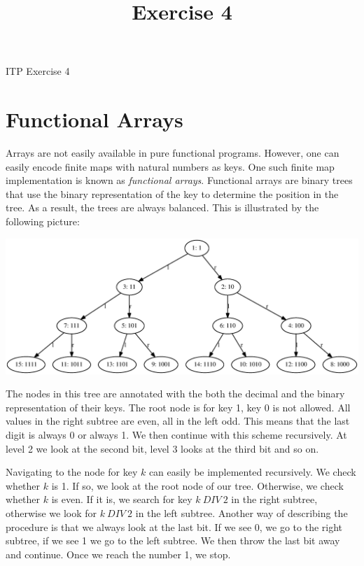 \documentclass[a4paper,10pt,oneside]{scrartcl}
\title{Exercise 4}
\begin{document}
\begin{center}
ITP Exercise 4
\end{center}
\bigskip


\section{Functional Arrays}

Arrays are not easily available in pure functional programs. However,
one can easily encode finite maps with natural numbers as keys. One
such finite map implementation is known as \emph{functional arrays}.
Functional arrays are binary trees that use the binary representation
of the key to determine the position in the tree. As a result, the
trees are always balanced. This is illustrated by the following picture:

\begin{center}
\includegraphics[width=14cm]{func_array.eps}
\end{center}

The nodes in this tree are annotated with the both the decimal and the binary representation of
their keys. The root node is for key 1, key 0 is not allowed. All values in 
the right subtree are even, all in the left odd. This means that the last digit is
always 0 or always 1. We then continue with this scheme recursively. At level 2 we look at the 
second bit, level 3 looks at the third bit and so on.

Navigating to the node for key $k$ can easily be implemented recursively. We check whether
$k$ is 1. If so, we look at the root node of our tree. Otherwise, we check whether $k$ is even.
If it is, we search for key $k\ \textit{DIV}\ 2$ in the right subtree, otherwise we look for
$k\ \textit{DIV}\ 2$ in the left subtree. Another way of describing the procedure is that we
always look at the last bit. If we see 0, we go to the right subtree, if we see 1 we go to the left subtree. We then throw the last bit away and continue. Once we reach the number 1, we stop.
\end{document}
